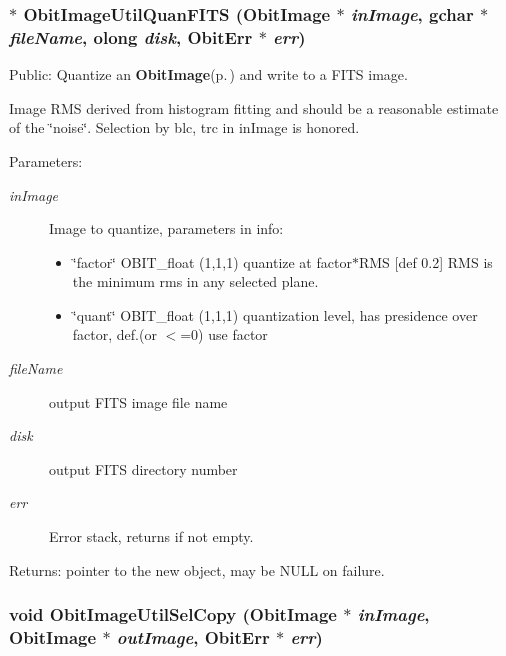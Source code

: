 \subsubsection{$\ast$ Obit\-Image\-Util\-Quan\-FITS ({\bf Obit\-Image} $\ast$ {\em in\-Image}, gchar $\ast$ {\em file\-Name}, {\bf olong} {\em disk}, {\bf Obit\-Err} $\ast$ {\em err})}\label{ObitImageUtil_8c_a17}


Public: Quantize an {\bf Obit\-Image}{\rm (p.\,\pageref{structObitImage})} and write to a FITS image. 

Image RMS derived from histogram fitting and should be a reasonable estimate of the \char`\"{}noise\char`\"{}. Selection by blc, trc in in\-Image is honored. \begin{Desc}
\item[Parameters:]
\begin{description}
\item[{\em in\-Image}]Image to quantize, parameters in info: \begin{itemize}
\item \char`\"{}factor\char`\"{} OBIT\_\-float (1,1,1) quantize at factor$\ast$RMS [def 0.2] RMS is the minimum rms in any selected plane. \item \char`\"{}quant\char`\"{} OBIT\_\-float (1,1,1) quantization level, has presidence over factor, def.(or $<$=0) use factor \end{itemize}
\item[{\em file\-Name}]output FITS image file name \item[{\em disk}]output FITS directory number \item[{\em err}]Error stack, returns if not empty. \end{description}
\end{Desc}
\begin{Desc}
\item[Returns:]pointer to the new object, may be NULL on failure. \end{Desc}
\subsubsection{\setlength{\rightskip}{0pt plus 5cm}void Obit\-Image\-Util\-Sel\-Copy ({\bf Obit\-Image} $\ast$ {\em in\-Image}, {\bf Obit\-Image} $\ast$ {\em out\-Image}, {\bf Obit\-Err} $\ast$ {\em err})}\label{ObitImageUtil_8c_a23}


